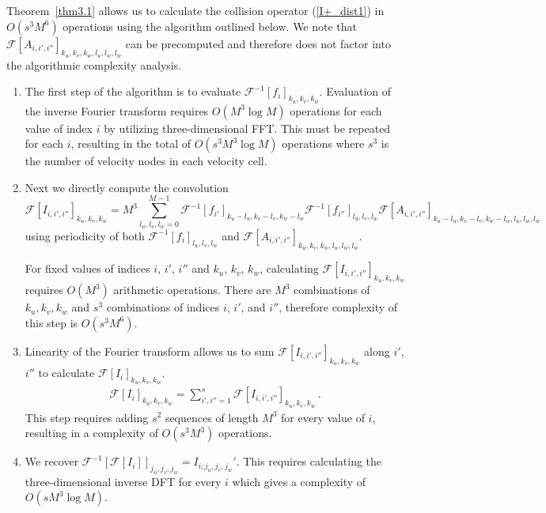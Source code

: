 \documentclass[12pt]{CSUNthesis}
\def\calF{\mathcal{F}}
\begin{document}
Theorem~\ref{thm3.1} allows us to calculate the collision operator 
(\ref{I+_dist1}) in $O(s^3 M^6)$ operations using the algorithm outlined below. 
We note that $\calF[A_{i,i',i''}]_{k_{u},k_{v},k_{w},l_{u},l_{w},l_{w}}$ 
can be precomputed and therefore does not factor into the algorithmic complexity analysis. 
\begin{enumerate}
	\item The first step of the algorithm is to evaluate $\calF^{-1}[f_i]_{k_u,k_v,k_w}$. Evaluation of the inverse Fourier transform requires $O(M^3 \log M)$ operations for each value of index $i$ by utilizing three-dimensional FFT. This must be repeated for each $i$, resulting in the total of $O(s^3 M^3 \log M)$ operations where $s^3$ is the number of velocity nodes in each velocity cell.
    \item Next we directly compute the convolution
	\begin{equation*}
		\calF [I_{i,i',i''}]_{k_{u},k_{v},k_{w}} = M^3 \sum_{l_{u},l_{v},l_{w}=0}^{M-1} \calF^{-1}[f_{i'}]_{k_{u}-l_{u},k_{v}-l_{v},k_{w}-l_{w}} \calF^{-1}[f_{i''}]_{l_{u},l_{v},l_{w}} \calF[A_{i,i',i''}]_{k_{u}-l_{u},k_{v}-l_{v},k_{w}-l_{w},l_{u},l_{w},l_{w}}\, 
	\end{equation*}
	using periodicity of both $\calF^{-1}[f_{i}]_{l_{u},l_{v},l_{w}}$ 
	and $\calF[A_{i,i',i''}]_{k_{u},k_{v},k_{w},l_{u},l_{w},l_{w}}$. 
	
    For fixed values of indices $i$, $i'$, $i''$ and $k_u$, $k_v$, $k_w$, calculating 
    $\calF [I_{i,i',i''}]_{k_{u},k_{v},k_{w}}$ requires $O(M^3)$ arithmetic operations. 
    There are $M^3$ combinations of $k_u,k_v,k_w$ and $s^3$ combinations of indices  $i$, $i'$, and $i''$, therefore complexity of this step is $O(s^3 M^6)$.

    \item Linearity of the Fourier transform allows us to sum $\calF[I_{i,i',i''}]_{k_u,k_v,k_w}$ along $i'$, $i''$ to calculate $\calF[I_i]_{k_u,k_v,k_w}$. 
    \begin{align*}
    \calF[I_{i}]_{k_{u},k_{v},k_{w}}
= \sum_{i',i''=1}^s \calF[I_{i,i',i''}]_{k_{u},k_{v},k_{w}}\, . 
    \end{align*}
    This step requires adding $s^2$ sequences of length $M^3$ for every value of $i$, resulting in a complexity of $O(s^3 M^3)$ operations. 
    \item We recover $\calF^{-1}[\calF[I_{i}]]_{j_u,j_v,j_w}=I_{i;j_u,j_v,j_w}'$.
    This requires calculating the three-dimensional inverse DFT for every $i$ which gives a complexity of $O(s M^3 \log M)$.
\end{enumerate}
\end{document}

